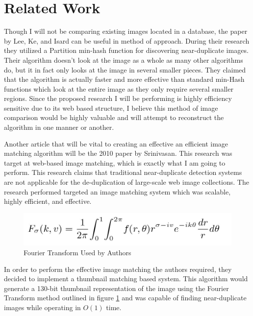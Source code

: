 \documentclass[11pt]{article}
\begin{document}
\section{Related Work}
\label{sec:relatedwork}
\vspace*{-.1in}


Though I will not be comparing existing images located in a database, the paper by Lee, Ke, and Isard \cite{Lee:2010} can be useful in method of approach. During their research they utilized a Partition min-hash function for discovering near-duplicate images. Their algorithm doesn't look at the image as a whole as many other algorithms do, but it in fact only looks at the image in several smaller pieces. They claimed that the algorithm is actually faster and more effective than standard min-Hash functions which look at the entire image as they only require several smaller regions. Since the proposed research I will be performing is highly efficiency sensitive due to its web based structure, I believe this method of image comparison would be highly valuable and will attempt to reconstruct the algorithm in one manner or another.

Another article that will be vital to creating an effective an efficient image matching algorithm will be the 2010 paper by Srinivasan. This research was target at web-based image matching, which is exactly what I am going to perform. This research claims that traditional near-duplicate detection systems are not applicable for the de-duplication of large-scale web image collections. \cite{Srinivasan:2008} The research performed targeted an image matching system which was scalable, highly efficient, and effective.

\begin{figure}[htbp]
\centering
\includegraphics[width=4.5in]{fourierTrans}
\caption{Fourier Transform Used by Authors}
\label{related-fourier}
\end{figure}

In order to perform the effective image matching the authors required, they decided to implement a thumbnail matching based system. This algorithm would generate a 130-bit thumbnail representation of the image using the Fourier Transform method outlined in figure \ref{related-fourier} and was capable of finding near-duplicate images while operating in $O(1)$ time.  \cite{Srinivasan:2008}
\end{document}
